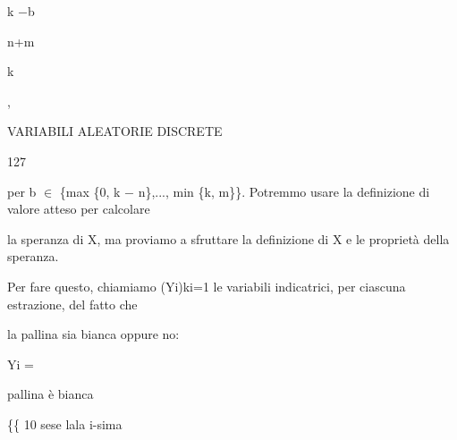 \documentclass[a4paper,portrait,12pt]{article}
\begin{document}
\begin{flushleft}
k $-$b
\end{flushleft}


\begin{flushleft}
n+m
\end{flushleft}


\begin{flushleft}
k
\end{flushleft}





,





\begin{flushleft}
 VARIABILI ALEATORIE DISCRETE
\end{flushleft}





127





\begin{flushleft}
per b $\in$ \{max \{0, k $-$ n\},..., min \{k, m\}\}. Potremmo usare la definizione di valore atteso per calcolare
\end{flushleft}


\begin{flushleft}
la speranza di X, ma proviamo a sfruttare la definizione di X e le propriet\`{a} della speranza.
\end{flushleft}


\begin{flushleft}
Per fare questo, chiamiamo (Yi)ki=1 le variabili indicatrici, per ciascuna estrazione, del fatto che
\end{flushleft}


\begin{flushleft}
la pallina sia bianca oppure no:
\end{flushleft}


\begin{flushleft}
Yi =
\end{flushleft}





\begin{flushleft}
pallina \`{e} bianca
\end{flushleft}


\begin{flushleft}
\{\{ 10 sese lala i-sima
\end{flushleft}
\end{document}
